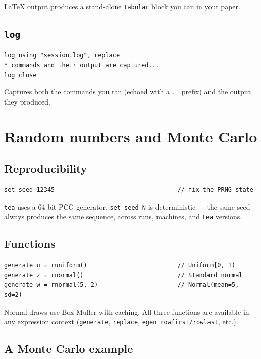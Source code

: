 \documentclass[11pt,letterpaper]{article}
\begin{document}
LaTeX output produces a stand-alone \texttt{tabular} block you can
\verb|| in your paper.

\subsection{\texttt{log}}

\begin{lstlisting}
log using "session.log", replace
* commands and their output are captured...
log close
\end{lstlisting}

Captures both the commands you ran (echoed with a \texttt{.~} prefix)
and the output they produced.

\section{Random numbers and Monte Carlo}\label{sec:mc}

\subsection{Reproducibility}

\begin{lstlisting}
set seed 12345                                  // fix the PRNG state
\end{lstlisting}

\texttt{tea} uses a 64-bit PCG generator.  \texttt{set seed N} is
deterministic — the same seed always produces the same sequence,
across runs, machines, and \texttt{tea} versions.

\subsection{Functions}

\begin{lstlisting}
generate u = runiform()                         // Uniform[0, 1)
generate z = rnormal()                          // Standard normal
generate w = rnormal(5, 2)                      // Normal(mean=5, sd=2)
\end{lstlisting}

Normal draws use Box-Muller with caching.  All three functions are
available in any expression context (\texttt{generate}, \texttt{replace},
\texttt{egen rowfirst/rowlast}, etc.).

\subsection{A Monte Carlo example}
\end{document}
